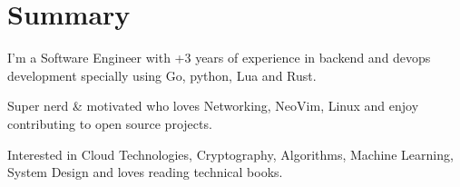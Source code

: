\section{Summary}\closesection{}

I'm a Software Engineer with +3 years of experience in backend and devops development specially using Go, python, Lua and Rust.

Super nerd \& motivated who loves Networking, NeoVim, Linux and enjoy contributing to open source projects.

Interested in Cloud Technologies, Cryptography, Algorithms, Machine Learning, System Design and loves reading technical books.
